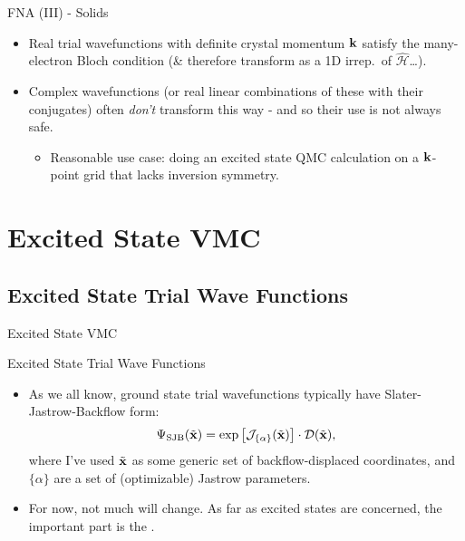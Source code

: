 \documentclass[12pt, pdf, hyperref={draft}, usenames, dvipsnames,
aspectratio=169]{beamer}
\newcommand{\red}[1]{{\bf\color{LancsRed}{#1}}}
\begin{document}
\begin{frame}{FNA (III) - Solids}

\begin{itemize}
  \item Real trial wavefunctions with definite crystal momentum ${\bf k}$
  satisfy the many-electron Bloch condition (\& therefore transform as a 1D
  irrep.\ of $\mathcal{\hat H}$\ldots).

  \item Complex wavefunctions (or real linear combinations of these with their
  conjugates) often \textit{don't} transform this way - and so their use is
  not always safe.

  \begin{itemize}

  \item Reasonable use case: doing an excited state QMC calculation on a ${\bf
  k}$-point grid that lacks inversion symmetry.

  \end{itemize}

\end{itemize}

\end{frame}


\section{Excited State VMC}\label{sec:excited_state_vmc}
\subsection{Excited State Trial Wave Functions}\label{sub:excited_trial_wfns}

\begin{frame}{Excited State VMC}
\begin{block}{Excited State Trial Wave Functions}
\begin{itemize}
  \item As we all know, ground state trial wavefunctions typically have
  Slater-Jastrow-Backflow form:
  \begin{equation}
    \Psi_{\text{SJB}}({\tilde{\bf x}}) = \exp{\left[ \mathcal{J}_{\{ \alpha \}}
    ({\tilde{\bf x}}) \right]}\cdot \mathcal{D}({\tilde{\bf x}}),
  \end{equation}
  where I've used ${\tilde{\bf x}}$ as some generic set of backflow-displaced
  coordinates, and $\{ \alpha \}$ are a set of (optimizable) Jastrow
  parameters.

  \item For now, not much will change. As far as excited states are concerned,
  the important part is the \red{Slater determinant}.
\end{itemize}
\end{block}

\end{frame}
\end{document}
